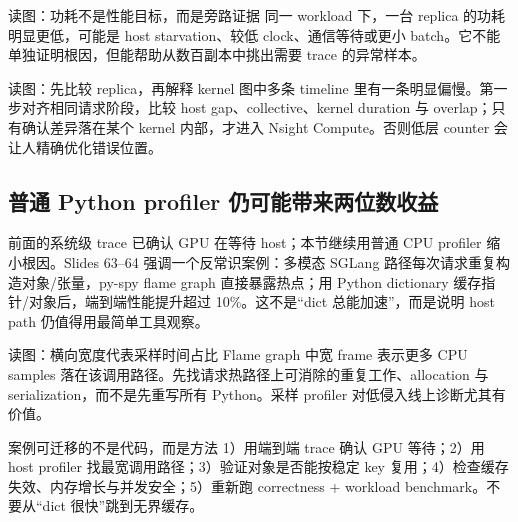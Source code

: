
\begin{knowledgebox}{读图：功耗不是性能目标，而是旁路证据}
同一 workload 下，一台 replica 的功耗明显更低，可能是 host starvation、较低 clock、通信等待或更小 batch。它不能单独证明根因，但能帮助从数百副本中挑出需要 trace 的异常样本。
\end{knowledgebox}


\begin{knowledgebox}{读图：先比较 replica，再解释 kernel}
图中多条 timeline 里有一条明显偏慢。第一步对齐相同请求阶段，比较 host gap、collective、kernel duration 与 overlap；只有确认差异落在某个 kernel 内部，才进入 Nsight Compute。否则低层 counter 会让人精确优化错误位置。
\end{knowledgebox}

\subsection{普通 Python profiler 仍可能带来两位数收益}

前面的系统级 trace 已确认 GPU 在等待 host；本节继续用普通 CPU profiler 缩小根因。Slides 63--64 强调一个反常识案例：多模态 SGLang 路径每次请求重复构造对象/张量，py-spy flame graph 直接暴露热点；用 Python dictionary 缓存指针/对象后，端到端性能提升超过 10\%。这不是“dict 总能加速”，而是说明 host path 仍值得用最简单工具观察。


\begin{knowledgebox}{读图：横向宽度代表采样时间占比}
Flame graph 中宽 frame 表示更多 CPU samples 落在该调用路径。先找请求热路径上可消除的重复工作、allocation 与 serialization，而不是先重写所有 Python。采样 profiler 对低侵入线上诊断尤其有价值。
\end{knowledgebox}


\begin{importantbox}{案例可迁移的不是代码，而是方法}
1）用端到端 trace 确认 GPU 等待；2）用 host profiler 找最宽调用路径；3）验证对象是否能按稳定 key 复用；4）检查缓存失效、内存增长与并发安全；5）重新跑 correctness + workload benchmark。不要从“dict 很快”跳到无界缓存。
\end{importantbox}


